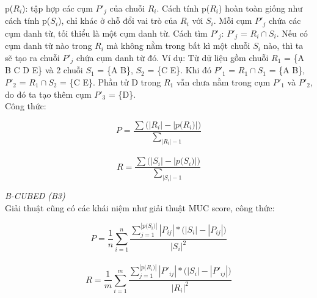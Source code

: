 \documentclass[12pt]{extarticle}
\begin{document}
				p($R_i$): tập hợp các cụm $P'_j$ của chuỗi $R_i$. Cách tính p($R_i$) hoàn toàn giống như cách tính p($S_i$), chỉ khác ở chỗ đổi vai trò của $R_i$ với $S_i$. Mỗi cụm $P'_j$ chứa các cụm danh từ, tối thiểu là một cụm danh từ. Cách tìm $P'_j$: $P'_j$ = $R_i \cap S_i$. Nếu có cụm danh từ nào trong $R_i$ mà không nằm trong bất kì một chuỗi $S_i$ nào, thì ta sẽ tạo ra chuỗi $P'_j$ chứa cụm danh từ đó. Ví dụ: Từ dữ liệu gồm chuỗi $R_1$ = \{A B C D E\} và 2  chuỗi $S_1$ = \{A B\}, $S_2$ = \{C E\}. Khi đó $P'_1$ = $R_1 \cap S_1$ = \{A B\}, $P'_2$ = $R_1 \cap S_2$ = \{C E\}. Phần tử D trong $R_1$ vẫn chưa nằm trong cụm $P'_1$ và $P'_2$, do đó ta tạo thêm cụm $P'_3$ = \{D\}.
				\\Công thức:					
					\begin{center}
						\begin{equation*}
							P = \frac{\sum \big(|R_i| - |p \big(R_i)|)}{\sum_{|R_i| - 1}}
						\end{equation*}
						\\
						\begin{equation*}
							R = \frac{\sum \big(|S_i| - |p \big(S_i)|)}{\sum_{|S_i| - 1}}
						\end{equation*}												
					\end{center}

					\textit{B-CUBED (B3)}
					\\Giải thuật cũng có các khái niệm như giải thuật MUC score, công thức:
					\begin{center}
						\begin{equation*}
							P = \frac{1}{n} \sum_{i=1}^{n} \frac{\sum_{j=1}^{|p \big(S_i)|} |P_{ij}|*\big(|S_i| - |P_{ij}|)} {|S_{i}|^2}
						\end{equation*}
						\\
						\begin{equation*}
							R = \frac{1}{m} \sum_{i=1}^{m} \frac{\sum_{j=1}^{|p \big(R_i)|} |P'_{ij}|*\big(|S_i| - |P'_{ij}|)} {|R_{i}|^2}
						\end{equation*}												
					\end{center}
\end{document}
